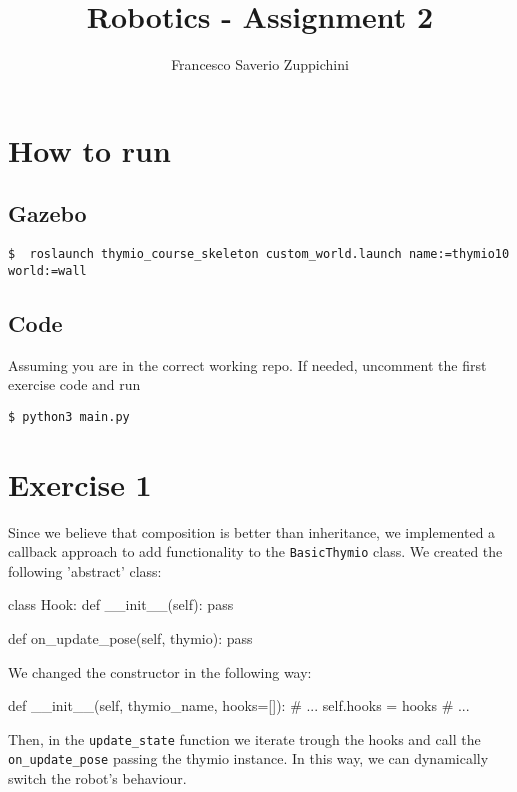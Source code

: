 \documentclass[11pt]{article}
\title{Robotics - Assignment 2}
\author{Francesco Saverio Zuppichini}
\begin{document}
\maketitle
\section{How to run}
\subsection{Gazebo}
\begin{lstlisting}
$  roslaunch thymio_course_skeleton custom_world.launch name:=thymio10 world:=wall	
\end{lstlisting}
\subsection{Code}
Assuming you are in the correct working repo. If needed, uncomment the first exercise code and run
\begin{lstlisting}
$ python3 main.py	
\end{lstlisting}
\section{Exercise 1}
Since we believe that composition is better than inheritance, we implemented a callback approach to add functionality to the \texttt{BasicThymio} class. We created the following 'abstract' class:

\begin{python}
class Hook:
    def __init__(self):
        pass

    def on_update_pose(self, thymio):
        pass
	
\end{python}

We changed the constructor in the following way:
\begin{python}

def __init__(self, thymio_name, hooks=[]):
	# ...
	self.hooks = hooks
	# ...
\end{python}

Then, in the \texttt{update\_state} function we iterate trough the hooks and call the \texttt{on\_update\_pose} passing the thymio instance. In this way, we can dynamically switch the robot's behaviour.
\end{document}
